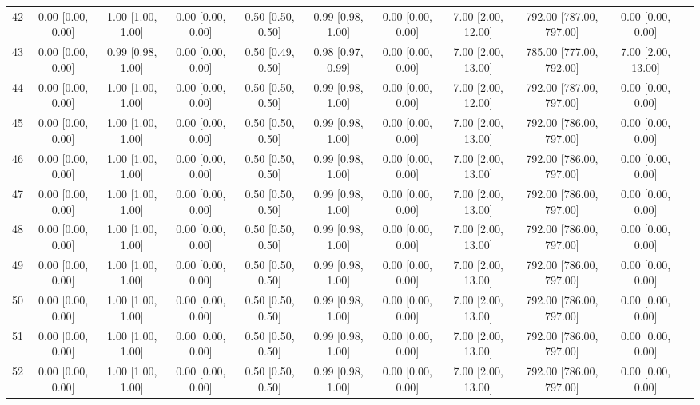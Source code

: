 \documentclass[8pt]{article}
\begin{document}
\begin{center}
\begin{footnotesize}
\begin{longtable}{|ccccccccccc|}
 42 &  0.00 [0.00, 0.00] &  1.00 [1.00, 1.00] &  0.00 [0.00, 0.00] &  0.50 [0.50, 0.50] &  0.99 [0.98, 1.00] &  0.00 [0.00, 0.00] &  7.00 [2.00, 12.00] &  792.00 [787.00, 797.00] &        0.00 [0.00, 0.00] \\
 43 &  0.00 [0.00, 0.00] &  0.99 [0.98, 1.00] &  0.00 [0.00, 0.00] &  0.50 [0.49, 0.50] &  0.98 [0.97, 0.99] &  0.00 [0.00, 0.00] &  7.00 [2.00, 13.00] &  785.00 [777.00, 792.00] &       7.00 [2.00, 13.00] \\
 44 &  0.00 [0.00, 0.00] &  1.00 [1.00, 1.00] &  0.00 [0.00, 0.00] &  0.50 [0.50, 0.50] &  0.99 [0.98, 1.00] &  0.00 [0.00, 0.00] &  7.00 [2.00, 12.00] &  792.00 [787.00, 797.00] &        0.00 [0.00, 0.00] \\
 45 &  0.00 [0.00, 0.00] &  1.00 [1.00, 1.00] &  0.00 [0.00, 0.00] &  0.50 [0.50, 0.50] &  0.99 [0.98, 1.00] &  0.00 [0.00, 0.00] &  7.00 [2.00, 13.00] &  792.00 [786.00, 797.00] &        0.00 [0.00, 0.00] \\
 46 &  0.00 [0.00, 0.00] &  1.00 [1.00, 1.00] &  0.00 [0.00, 0.00] &  0.50 [0.50, 0.50] &  0.99 [0.98, 1.00] &  0.00 [0.00, 0.00] &  7.00 [2.00, 13.00] &  792.00 [786.00, 797.00] &        0.00 [0.00, 0.00] \\
 47 &  0.00 [0.00, 0.00] &  1.00 [1.00, 1.00] &  0.00 [0.00, 0.00] &  0.50 [0.50, 0.50] &  0.99 [0.98, 1.00] &  0.00 [0.00, 0.00] &  7.00 [2.00, 13.00] &  792.00 [786.00, 797.00] &        0.00 [0.00, 0.00] \\
 48 &  0.00 [0.00, 0.00] &  1.00 [1.00, 1.00] &  0.00 [0.00, 0.00] &  0.50 [0.50, 0.50] &  0.99 [0.98, 1.00] &  0.00 [0.00, 0.00] &  7.00 [2.00, 13.00] &  792.00 [786.00, 797.00] &        0.00 [0.00, 0.00] \\
 49 &  0.00 [0.00, 0.00] &  1.00 [1.00, 1.00] &  0.00 [0.00, 0.00] &  0.50 [0.50, 0.50] &  0.99 [0.98, 1.00] &  0.00 [0.00, 0.00] &  7.00 [2.00, 13.00] &  792.00 [786.00, 797.00] &        0.00 [0.00, 0.00] \\
 50 &  0.00 [0.00, 0.00] &  1.00 [1.00, 1.00] &  0.00 [0.00, 0.00] &  0.50 [0.50, 0.50] &  0.99 [0.98, 1.00] &  0.00 [0.00, 0.00] &  7.00 [2.00, 13.00] &  792.00 [786.00, 797.00] &        0.00 [0.00, 0.00] \\
 51 &  0.00 [0.00, 0.00] &  1.00 [1.00, 1.00] &  0.00 [0.00, 0.00] &  0.50 [0.50, 0.50] &  0.99 [0.98, 1.00] &  0.00 [0.00, 0.00] &  7.00 [2.00, 13.00] &  792.00 [786.00, 797.00] &        0.00 [0.00, 0.00] \\
 52 &  0.00 [0.00, 0.00] &  1.00 [1.00, 1.00] &  0.00 [0.00, 0.00] &  0.50 [0.50, 0.50] &  0.99 [0.98, 1.00] &  0.00 [0.00, 0.00] &  7.00 [2.00, 13.00] &  792.00 [786.00, 797.00] &        0.00 [0.00, 0.00] \\

\end{longtable}
\end{footnotesize}
\end{center}
\end{document}
